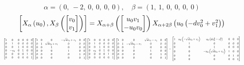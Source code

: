 \documentclass[11pt]{article}
\theoremstyle{definition}
\begin{document}
\[
\alpha = \left( 0, \  -2, \  0, \  0, \  0, \  0\right), \quad \beta = \left( 1, \  1, \  0, \  0, \  0, \  0\right)
\]
\[
\scaletoalign{\textwidth}{\left[ X_{\alpha}\left(u_{0}\right), X_{\beta}\left(\left[\begin{matrix}v_{0}\\v_{1}\end{matrix}\right]\right) \right] = X_{\alpha + \beta}\left(\left[\begin{matrix}u_{0} v_{1}\\- u_{0} v_{0}\end{matrix}\right]\right) X_{\alpha + 2\beta}\left(u_{0} \left(- d v_{0}^{2} + v_{1}^{2}\right)\right)}
\]
\[
\scaletoalign{\textwidth}{{\left[\begin{matrix}1 & 0 & 0 & 0 & 0 & 0\\0 & 1 & 0 & 0 & 0 & 0\\0 & 0 & 1 & 0 & 0 & 0\\0 & - u_{0} & 0 & 1 & 0 & 0\\0 & 0 & 0 & 0 & 1 & 0\\0 & 0 & 0 & 0 & 0 & 1\end{matrix}\right]} {\left[\begin{matrix}1 & 0 & 0 & - \sqrt{d} v_{0} + v_{1} & 0 & 0\\0 & 1 & \sqrt{d} v_{0} + v_{1} & 0 & 0 & 0\\0 & 0 & 1 & 0 & 0 & 0\\0 & 0 & 0 & 1 & 0 & 0\\0 & 0 & 0 & 0 & 1 & 0\\0 & 0 & 0 & 0 & 0 & 1\end{matrix}\right]} {\left[\begin{matrix}1 & 0 & 0 & 0 & 0 & 0\\0 & 1 & 0 & 0 & 0 & 0\\0 & 0 & 1 & 0 & 0 & 0\\0 & u_{0} & 0 & 1 & 0 & 0\\0 & 0 & 0 & 0 & 1 & 0\\0 & 0 & 0 & 0 & 0 & 1\end{matrix}\right]} {\left[\begin{matrix}1 & 0 & 0 & \sqrt{d} v_{0} - v_{1} & 0 & 0\\0 & 1 & - \sqrt{d} v_{0} - v_{1} & 0 & 0 & 0\\0 & 0 & 1 & 0 & 0 & 0\\0 & 0 & 0 & 1 & 0 & 0\\0 & 0 & 0 & 0 & 1 & 0\\0 & 0 & 0 & 0 & 0 & 1\end{matrix}\right]} = {\left[\begin{matrix}1 & u_{0} \left(- \sqrt{d} v_{0} + v_{1}\right) & u_{0} \left(d v_{0}^{2} - v_{1}^{2}\right) & 0 & 0 & 0\\0 & 1 & 0 & 0 & 0 & 0\\0 & 0 & 1 & 0 & 0 & 0\\0 & 0 & - u_{0} \left(\sqrt{d} v_{0} + v_{1}\right) & 1 & 0 & 0\\0 & 0 & 0 & 0 & 1 & 0\\0 & 0 & 0 & 0 & 0 & 1\end{matrix}\right]}}
\]
\end{document}
